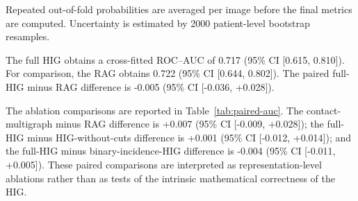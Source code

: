 Repeated out-of-fold probabilities are averaged per image before the
final metrics are computed. Uncertainty is estimated by
2000 patient-level bootstrap resamples.





The full HIG obtains a cross-fitted ROC--AUC of
0.717
(95\% CI [0.615, 0.810]).
For comparison, the RAG obtains
0.722
(95\% CI [0.644, 0.802]).
The paired full-HIG minus RAG difference is
-0.005
(95\% CI [-0.036,
+0.028]).

The ablation comparisons are reported in
Table~\ref{tab:paired-auc}. The contact-multigraph minus RAG difference
is +0.007
(95\% CI [-0.009,
+0.028]); the full-HIG minus
HIG-without-cuts difference is +0.001
(95\% CI [-0.012,
+0.014]); and the full-HIG minus
binary-incidence-HIG difference is -0.004
(95\% CI [-0.011,
+0.005]).
These paired comparisons are interpreted as representation-level
ablations rather than as tests of the intrinsic mathematical correctness
of the HIG.

